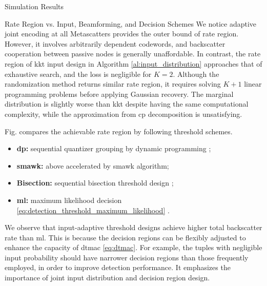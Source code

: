 \documentclass[journal]{IEEEtran}
\begin{document}
\begin{section}{Simulation Results}
\begin{subsection}{Rate Region vs. Input, Beamforming, and Decision Schemes}
		We notice adaptive joint encoding at all Metascatters provides the outer bound of rate region.
		However, it involves arbitrarily dependent codewords, and backscatter cooperation between passive nodes is generally unaffordable.
		In contrast, the rate region of \gls{kkt} input design in Algorithm \ref{al:input_distribution} approaches that of exhaustive search, and the loss is negligible for $K=2$.
		Although the randomization method \cite{Calvo2010} returns similar rate region, it requires solving $K+1$ linear programming problems before applying Gaussian recovery.
		The marginal distribution is slightly worse than \gls{kkt} despite having the same computational complexity, while the approximation from \gls{cp} decomposition is unsatisfying.


		Fig.  compares the achievable rate region by following threshold schemes.
		\begin{itemize}
			\item \textbf{\gls{dp}:} sequential quantizer grouping by dynamic programming \cite{He2021};
			\item \textbf{\gls{smawk}:} above accelerated by \gls{smawk} algorithm;
			\item \textbf{Bisection:} sequential bisection threshold design \cite{Nguyen2020a};
			\item \textbf{\gls{ml}:} maximum likelihood decision \eqref{eq:detection_threshold_maximum_likelihood} \cite{Qian2019}.
		\end{itemize}

		We observe that input-adaptive threshold designs achieve higher total backscatter rate than \gls{ml}.
		This is because the decision regions can be flexibly adjusted to enhance the capacity of \gls{dtmac} \eqref{eq:dtmac}.
		For example, the tuples with negligible input probability should have narrower decision regions than those frequently employed, in order to improve detection performance.
		It emphasizes the importance of joint input distribution and decision region design.

	\end{subsection}



\end{section}
\end{document}
